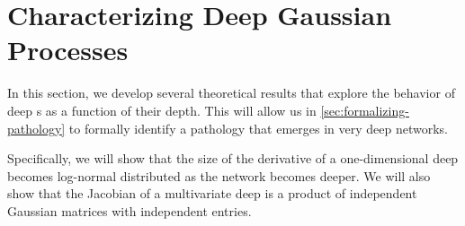 %


%





\section{Characterizing Deep Gaussian Processes}
\label{sec:characterizing-deep-gps}

In this section, we develop several theoretical results that explore the behavior of deep \gp{}s as a function of their depth.
This will allow us in \cref{sec:formalizing-pathology} to formally identify a pathology that emerges in very deep networks.

Specifically, we will show that the size of the derivative of a one-dimensional deep \gp{} becomes log-normal distributed as the network becomes deeper.
We will also show that the Jacobian of a multivariate deep \gp{} is a product of independent Gaussian matrices with independent entries.


